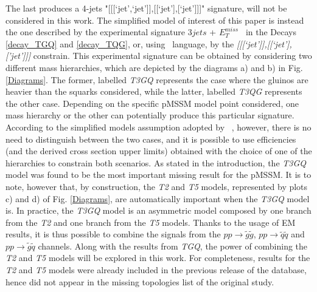 \documentclass[epj,nopacs,fleqn]{svjour}
\newcommand{\MET}{{ $E_T ^{miss}$}}
\begin{document}
The last produces a 4-jets "[[[`jet',`jet']],[[`jet'],[`jet']]]" signature, will not be considered in this work. The simplified model of interest of this paper is instead the one described by the experimental signature $3jets$ + \MET~ in the Decays \ref{decay_TGQ} and \ref{decay_TQG}, or, using \SMO~language, by the \textit{[[[`jet']],[[`jet'],['jet']]]} constrain. This experimental signature can be obtained by considering two different mass hierarchies, which are depicted by the diagrams a) and b) in Fig. \ref{Diagrams}. The former, labelled \textit{T3GQ} represents the case where the gluinos are heavier than the squarks considered, while the latter, labelled \textit{T3QG} represents the other case. Depending on the specific pMSSM model point considered, one mass hierarchy or the other can potentially produce this particular signature. According to the simplified models assumption adopted by \SMO~, however, there is no need to distinguish between the two cases, and it is possible to use efficiencies (and the derived cross section upper limits) obtained with the choice of one of the hierarchies to constrain both scenarios. 
%
As stated in the introduction, the \textit{T3GQ} model was found to be the most important missing result for the pMSSM. It is to note, however that, by construction, the \textit{T2} and \textit{T5} models, represented by plots c) and d) of Fig. \ref{Diagrams}, are automatically important when the \textit{T3GQ} model is. In practice, the \textit{T3GQ} model is an asymmetric model composed by one branch from the \textit{T2} and one branch from the \textit{T5} models. Thanks to the usage of EM results, it is thus possible to combine the signals from the $pp \rightarrow \tilde g \tilde g$, $pp \rightarrow \tilde q \tilde q$ and $pp \rightarrow \tilde g \tilde q$ channels. Along with the results from \textit{TGQ}, the power of combining the \textit{T2} and \textit{T5} models will be explored in this work. For completeness, results for the \textit{T2} and \textit{T5} models were already included in the previous release of the database, hence did not appear in the missing topologies list of the original study.
\end{document}
